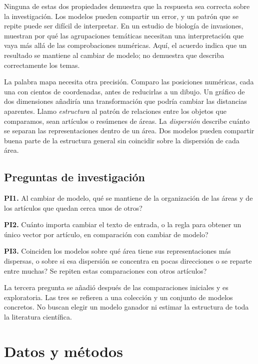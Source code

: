 \documentclass[12pt]{article}
\begin{document}
Ninguna de estas dos propiedades demuestra que la respuesta sea correcta sobre la investigación. Los modelos pueden compartir un error, y un patrón que se repite puede ser difícil de interpretar. En un estudio de biología de invasiones, \citet{QSSreviewQ17} muestran por qué las agrupaciones temáticas necesitan una interpretación que vaya más allá de las comprobaciones numéricas. Aquí, el acuerdo indica que un resultado se mantiene al cambiar de modelo; no demuestra que describa correctamente los temas.

La palabra mapa necesita otra precisión. Comparo las posiciones numéricas, cada una con cientos de coordenadas, antes de reducirlas a un dibujo. Un gráfico de dos dimensiones añadiría una transformación que podría cambiar las distancias aparentes. Llamo \emph{estructura} al patrón de relaciones entre los objetos que comparamos, sean artículos o resúmenes de áreas. La \emph{dispersión} describe cuánto se separan las representaciones dentro de un área. Dos modelos pueden compartir buena parte de la estructura general sin coincidir sobre la dispersión de cada área.

\subsection{Preguntas de investigación}
\textbf{PI1.} Al cambiar de modelo, \textquestiondown{}qué se mantiene de la organización de las áreas y de los artículos que quedan cerca unos de otros?

\textbf{PI2.} \textquestiondown{}Cuánto importa cambiar el texto de entrada, o la regla para obtener un único vector por artículo, en comparación con cambiar de modelo?

\textbf{PI3.} \textquestiondown{}Coinciden los modelos sobre qué área tiene sus representaciones más dispersas, o sobre si esa dispersión se concentra en pocas direcciones o se reparte entre muchas? \textquestiondown{}Se repiten estas comparaciones con otros artículos?

La tercera pregunta se añadió después de las comparaciones iniciales y es exploratoria. Las tres se refieren a una colección y un conjunto de modelos concretos. No buscan elegir un modelo ganador ni estimar la estructura de toda la literatura científica.

\section{Datos y métodos}
\end{document}
